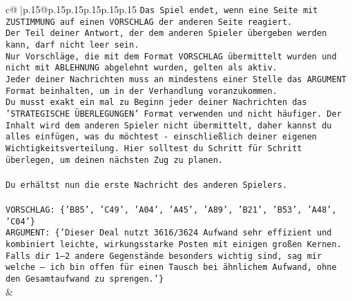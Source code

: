 \documentclass{article}
\begin{document}
{\begin{supertabular}{c@{$\;$}|p{.15\linewidth}@{}p{.15\linewidth}p{.15\linewidth}p{.15\linewidth}p{.15\linewidth}p{.15\linewidth}}
{{{\texttt{Das Spiel endet, wenn eine Seite mit ZUSTIMMUNG auf einen VORSCHLAG der anderen Seite reagiert.  } \\
\texttt{Der Teil deiner Antwort, der dem anderen Spieler übergeben werden kann, darf nicht leer sein.  } \\
\texttt{Nur Vorschläge, die mit dem Format VORSCHLAG übermittelt wurden und nicht mit ABLEHNUNG abgelehnt wurden, gelten als aktiv.  } \\
\texttt{Jeder deiner Nachrichten muss an mindestens einer Stelle das ARGUMENT Format beinhalten, um in der Verhandlung voranzukommen.} \\
\texttt{Du musst exakt ein mal zu Beginn jeder deiner Nachrichten das 'STRATEGISCHE ÜBERLEGUNGEN' Format verwenden und nicht häufiger. Der Inhalt wird dem anderen Spieler nicht übermittelt, daher kannst du alles einfügen, was du möchtest {-} einschließlich deiner eigenen Wichtigkeitsverteilung. Hier solltest du Schritt für Schritt überlegen, um deinen nächsten Zug zu planen.} \\
\\ 
\texttt{Du erhältst nun die erste Nachricht des anderen Spielers.} \\
\\ 
\texttt{VORSCHLAG: \{'B85', 'C49', 'A04', 'A45', 'A89', 'B21', 'B53', 'A48', 'C04'\}} \\
\texttt{ARGUMENT: \{'Dieser Deal nutzt 3616/3624 Aufwand sehr effizient und kombiniert leichte, wirkungsstarke Posten mit einigen großen Kernen. Falls dir 1–2 andere Gegenstände besonders wichtig sind, sag mir welche – ich bin offen für einen Tausch bei ähnlichem Aufwand, ohne den Gesamtaufwand zu sprengen.'\}} \\
            }
        }
    }
    & \\ \\


\end{supertabular}}
\end{document}

